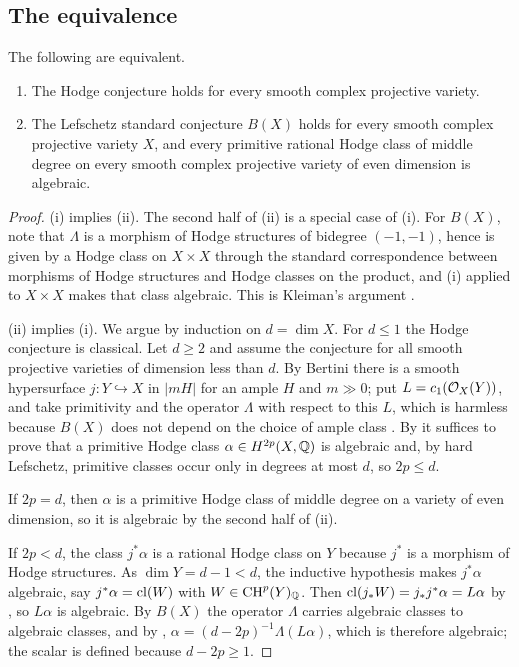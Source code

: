 \subsection{The equivalence}

\begin{theorem}\label{thm:equivalence}
The following are equivalent.
\begin{enumerate}[label=\textup{(\roman*)}]
\item The Hodge conjecture holds for every smooth complex projective variety.
\item The Lefschetz standard conjecture $B(X)$ holds for every smooth complex
  projective variety $X$, and every primitive rational Hodge class of middle
  degree on every smooth complex projective variety of even dimension is
  algebraic.
\end{enumerate}
\end{theorem}

\begin{proof}
(i) implies (ii). The second half of (ii) is a special case of (i). For
$B(X)$, note that $\Lambda$ is a morphism of Hodge structures of bidegree
$(-1,-1)$, hence is given by a Hodge class on $X\times X$ through the
standard correspondence between morphisms of Hodge structures and Hodge
classes on the product, and (i) applied to $X\times X$ makes that class
algebraic. This is Kleiman's argument \cite[\S2]{Kle68}.

(ii) implies (i). We argue by induction on $d=\dim X$. For $d\le1$ the Hodge
conjecture is classical. Let $d\ge2$ and assume the conjecture for all smooth
projective varieties of dimension less than $d$. By Bertini there is a smooth
hypersurface $j\colon Y\hookrightarrow X$ in $|mH|$ for an ample $H$ and
$m\gg0$; put $L=c_{1}(\mathcal{O}_{X}(Y))$, and take primitivity and the operator
$\Lambda$ with respect to this $L$, which is harmless because $B(X)$ does not
depend on the choice of ample class \cite{Kle68,Kle94}. By
 it suffices to prove that a primitive Hodge class
$\alpha\in H^{2p}(X,\mathbb{Q})$ is algebraic and, by hard Lefschetz, primitive
classes occur only in degrees at most $d$, so $2p\le d$.

If $2p=d$, then $\alpha$ is a primitive Hodge class of middle degree on a
variety of even dimension, so it is algebraic by the second half of (ii).

If $2p<d$, the class $j^{*}\alpha$ is a rational Hodge class on $Y$ because
$j^{*}$ is a morphism of Hodge structures. As $\dim Y=d-1<d$, the inductive
hypothesis makes $j^{*}\alpha$ algebraic, say $j^{*}\alpha=\mathrm{cl}(W)$ with
$W\in\operatorname{CH}^{p}(Y)_{\mathbb{Q}}$. Then
$\mathrm{cl}(j_{*}W)=j_{*}j^{*}\alpha=L\alpha$ by , so
$L\alpha$ is algebraic. By $B(X)$ the operator $\Lambda$ carries algebraic
classes to algebraic classes, and by ,
$\alpha=(d-2p)^{-1}\Lambda(L\alpha)$, which is therefore algebraic; the scalar
is defined because $d-2p\ge1$.
\end{proof}

